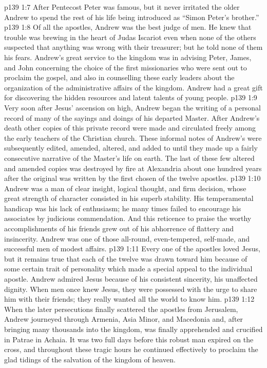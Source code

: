 \vs p139 1:7 After Pentecost Peter was famous, but it never irritated the older Andrew to spend the rest of his life being introduced as “Simon Peter’s brother.”
\vs p139 1:8 \pc Of all the apostles, Andrew was the best judge of men. He knew that trouble was brewing in the heart of Judas Iscariot even when none of the others suspected that anything was wrong with their treasurer; but he told none of them his fears. Andrew’s great service to the kingdom was in advising Peter, James, and John concerning the choice of the first missionaries who were sent out to proclaim the gospel, and also in counselling these early leaders about the organization of the administrative affairs of the kingdom. Andrew had a great gift for discovering the hidden resources and latent talents of young people.
\vs p139 1:9 Very soon after Jesus’ ascension on high, Andrew began the writing of a personal record of many of the sayings and doings of his departed Master. After Andrew’s death other copies of this private record were made and circulated freely among the early teachers of the Christian church. These informal notes of Andrew’s were subsequently edited, amended, altered, and added to until they made up a fairly consecutive narrative of the Master’s life on earth. The last of these few altered and amended copies was destroyed by fire at Alexandria about one hundred years after the original was written by the first chosen of the twelve apostles.
\vs p139 1:10 Andrew was a man of clear insight, logical thought, and firm decision, whose great strength of character consisted in his superb stability. His temperamental handicap was his lack of enthusiasm; he many times failed to encourage his associates by judicious commendation. And this reticence to praise the worthy accomplishments of his friends grew out of his abhorrence of flattery and insincerity. Andrew was one of those all\hyp{}round, even\hyp{}tempered, self\hyp{}made, and successful men of modest affairs.
\vs p139 1:11 \pc Every one of the apostles loved Jesus, but it remains true that each of the twelve was drawn toward him because of some certain trait of personality which made a special appeal to the individual apostle. Andrew admired Jesus because of his consistent sincerity, his unaffected dignity. When men once knew Jesus, they were possessed with the urge to share him with their friends; they really wanted all the world to know him.
\vs p139 1:12 \pc When the later persecutions finally scattered the apostles from Jerusalem, Andrew journeyed through Armenia, Asia Minor, and Macedonia and, after bringing many thousands into the kingdom, was finally apprehended and crucified in Patrae in Achaia. It was two full days before this robust man expired on the cross, and throughout these tragic hours he continued effectively to proclaim the glad tidings of the salvation of the kingdom of heaven.
